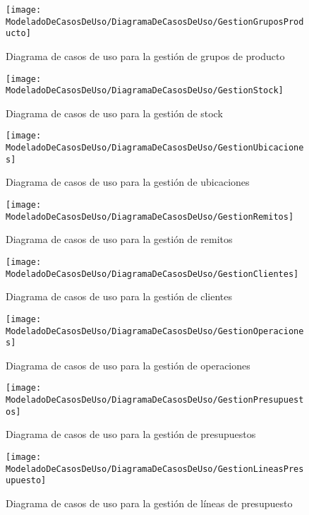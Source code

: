    \begin{figure}[H]
		\centering
		\texttt{[image: ModeladoDeCasosDeUso/DiagramaDeCasosDeUso/GestionGruposProducto]}
		\caption{Diagrama de casos de uso para la gestión de grupos de producto}
	\label{fig:GestionGruposProducto}
	\end{figure}
	\begin{figure}[H]
		\centering
		\texttt{[image: ModeladoDeCasosDeUso/DiagramaDeCasosDeUso/GestionStock]}
		\caption{Diagrama de casos de uso para la gestión de stock}
	\label{fig:GestionStock}
	\end{figure}
	\begin{figure}[H]
		\centering
		\texttt{[image: ModeladoDeCasosDeUso/DiagramaDeCasosDeUso/GestionUbicaciones]}
		\caption{Diagrama de casos de uso para la gestión de ubicaciones}
	\label{fig:GestionUbicaciones}
    \end{figure}
	\begin{figure}[H]
		\centering
		\texttt{[image: ModeladoDeCasosDeUso/DiagramaDeCasosDeUso/GestionRemitos]}
		\caption{Diagrama de casos de uso para la gestión de remitos}
	\label{fig:GestionRemitos}
    \end{figure}
    \begin{figure}[H]
		\centering
		\texttt{[image: ModeladoDeCasosDeUso/DiagramaDeCasosDeUso/GestionClientes]}
		\caption{Diagrama de casos de uso para la gestión de clientes}
	\label{fig:GestionClientes}
	\end{figure}
	\begin{figure}[H]
		\centering
		\texttt{[image: ModeladoDeCasosDeUso/DiagramaDeCasosDeUso/GestionOperaciones]}
		\caption{Diagrama de casos de uso para la gestión de operaciones}
	\label{fig:GestionOperaciones}
	\end{figure}
    \begin{figure}[H]
		\centering
		\texttt{[image: ModeladoDeCasosDeUso/DiagramaDeCasosDeUso/GestionPresupuestos]}
		\caption{Diagrama de casos de uso para la gestión de presupuestos}
	\label{fig:GestionPresupuestos}
    \end{figure}
    \begin{figure}[H]
		\centering
		\texttt{[image: ModeladoDeCasosDeUso/DiagramaDeCasosDeUso/GestionLineasPresupuesto]}
		\caption{Diagrama de casos de uso para la gestión de líneas de presupuesto}
	\label{fig:GestionLineasPresupuesto}
    \end{figure}
